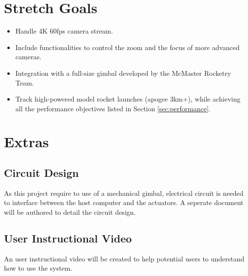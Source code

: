 \documentclass{article}
\begin{document}
\section{Stretch Goals}

\begin{itemize}
  \item Handle 4K 60fps camera stream.
  \item Include functionalities to control the zoom and the focus of more advanced
        cameras.
  \item Integration with a full-size gimbal developed by the McMaster Rocketry Team.
  \item Track high-powered model rocket launches (apogee 3km+), while achieving all the
        performance objectives listed in Section \ref{sec:performance}.
\end{itemize}

\section{Extras}


\subsection{Circuit Design}

As this project require to use of a mechanical gimbal, electrical circuit is
needed to interface between the host computer and the actuators. A seperate
document will be authored to detail the circuit design.

\subsection{User Instructional Video}

An user instructional video will be created to help potential users to
understand how to use the system.

\newpage{}
\end{document}
